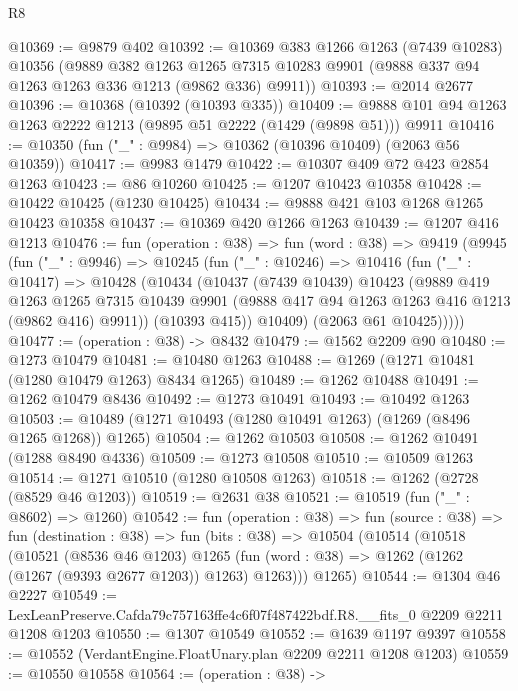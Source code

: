 \begin{lexlean}{R8}
\begin{coremodule}
@10369 := @9879 @402
@10392 := @10369
    @383
    @1266
    @1263
    (@7439 @10283)
    @10356
    (@9889
      @382
      @1263
      @1265
      @7315
      @10283
      @9901
      (@9888 @337 @94 @1263 @1263 @336 @1213 (@9862 @336) @9911))
@10393 := @2014 @2677
@10396 := @10368 (@10392 (@10393 @335))
@10409 := @9888 @101 @94 @1263 @1263 @2222 @1213 (@9895 @51 @2222 (@1429 (@9898 @51))) @9911
@10416 := @10350 (fun ("_" : @9984) => @10362 (@10396 @10409) (@2063 @56 @10359))
@10417 := @9983 @1479
@10422 := @10307 @409 @72 @423 @2854 @1263
@10423 := @86 @10260
@10425 := @1207 @10423 @10358
@10428 := @10422 @10425 (@1230 @10425)
@10434 := @9888 @421 @103 @1268 @1265 @10423 @10358
@10437 := @10369 @420 @1266 @1263
@10439 := @1207 @416 @1213
@10476 := fun (operation : @38) =>
  fun (word : @38) =>
  @9419
    (@9945
      (fun ("_" : @9946) =>
      @10245
        (fun ("_" : @10246) =>
        @10416
          (fun ("_" : @10417) =>
          @10428
            (@10434
              (@10437
                (@7439 @10439)
                @10423
                (@9889
                  @419
                  @1263
                  @1265
                  @7315
                  @10439
                  @9901
                  (@9888 @417 @94 @1263 @1263 @416 @1213 (@9862 @416) @9911))
                (@10393 @415))
              @10409)
            (@2063 @61 @10425)))))
@10477 := (operation : @38) -> @8432
@10479 := @1562 @2209 @90
@10480 := @1273 @10479
@10481 := @10480 @1263
@10488 := @1269 (@1271 @10481 (@1280 @10479 @1263) @8434 @1265)
@10489 := @1262 @10488
@10491 := @1262 @10479 @8436
@10492 := @1273 @10491
@10493 := @10492 @1263
@10503 := @10489 (@1271 @10493 (@1280 @10491 @1263) (@1269 (@8496 @1265 @1268)) @1265)
@10504 := @1262 @10503
@10508 := @1262 @10491 (@1288 @8490 @4336)
@10509 := @1273 @10508
@10510 := @10509 @1263
@10514 := @1271 @10510 (@1280 @10508 @1263)
@10518 := @1262 (@2728 (@8529 @46 @1203))
@10519 := @2631 @38
@10521 := @10519 (fun ("_" : @8602) => @1260)
@10542 := fun (operation : @38) =>
  fun (source : @38) =>
  fun (destination : @38) =>
  fun (bits : @38) =>
  @10504
    (@10514
      (@10518
        (@10521
          (@8536 @46 @1203)
          @1265
          (fun (word : @38) => @1262 (@1262 (@1267 (@9393 @2677 @1203)) @1263) @1263)))
      @1265)
@10544 := @1304 @46 @2227
@10549 := LexLeanPreserve.Cafda79c757163ffe4c6f07f487422bdf.R8.__fits_0 @2209 @2211 @1208 @1203
@10550 := @1307 @10549
@10552 := @1639 @1197 @9397
@10558 := @10552 (VerdantEngine.FloatUnary.plan @2209 @2211 @1208 @1203)
@10559 := @10550 @10558
@10564 := (operation : @38) ->

\end{coremodule}
\end{lexlean}
